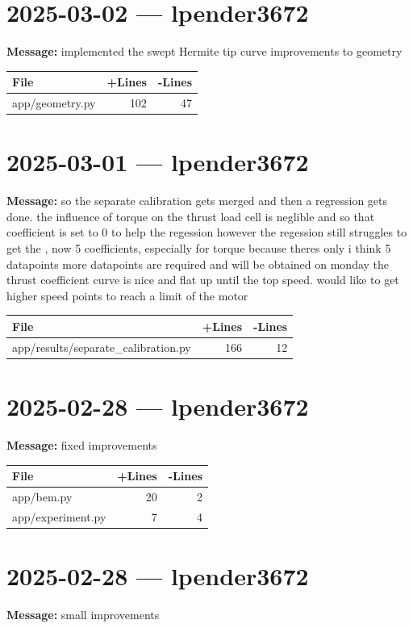 \documentclass{article}
\begin{document}
\section*{2025-03-02 --- lpender3672}
\textbf{Message:} implemented the swept Hermite tip curve improvements to geometry

\begin{longtable}{|p{10cm}|r|r|}
\hline \textbf{File} & \textbf{+Lines} & \textbf{-Lines} \\
\hline
app/geometry.py & 102 & 47 \\
\hline
\end{longtable}

\section*{2025-03-01 --- lpender3672}
\textbf{Message:} so the separate calibration gets merged and then a regression gets done. the influence of torque on the thrust load cell is neglible and so that coefficient is set to 0 to help the regession however the regession still struggles to get the , now 5 coefficients, especially for torque because theres only i think 5 datapoints more datapoints are required and will be obtained on monday the thrust coefficient curve is nice and flat up until the top speed. would like to get higher speed points to reach a limit of the motor

\begin{longtable}{|p{10cm}|r|r|}
\hline \textbf{File} & \textbf{+Lines} & \textbf{-Lines} \\
\hline
app/results/separate\_calibration.py & 166 & 12 \\
\hline
\end{longtable}

\section*{2025-02-28 --- lpender3672}
\textbf{Message:} fixed improvements

\begin{longtable}{|p{10cm}|r|r|}
\hline \textbf{File} & \textbf{+Lines} & \textbf{-Lines} \\
\hline
app/bem.py & 20 & 2 \\
\hline
app/experiment.py & 7 & 4 \\
\hline
\end{longtable}

\section*{2025-02-28 --- lpender3672}
\textbf{Message:} small improvements
\end{document}
